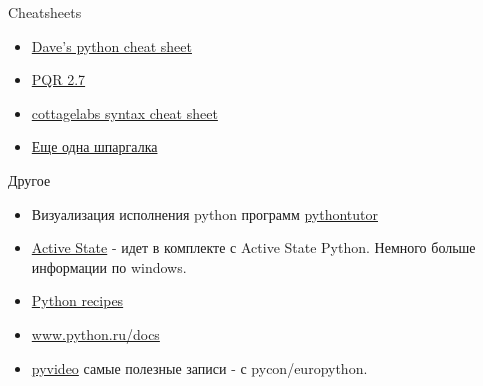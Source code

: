 \documentclass{article}
\begin{document}
\begin{center} Cheatsheets \end{center}
\begin{itemize}
	\item \href{http://www.addedbytes.com/cheat-sheets/python-cheat-sheet/}{Dave's python cheat sheet} 
	\item \href{http://rgruet.free.fr/PQR27/PQR2.7_printing_a4.pdf}{PQR 2.7} 
	\item \href{http://cottagelabs.com/news/python-language-syntax-cheat-sheet}{cottagelabs syntax cheat sheet}
	\item \href{http://cheatography.com/sschaub/cheat-sheets/essential-python/}{Еще одна шпаргалка}
\end{itemize}

\begin{center} Другое \end{center}
\begin{itemize}
	\item Визуализация исполнения python программ 
			\href{http://www.pythontutor.com/visualize.html}{pythontutor}
	\item \href{http://www.activestate.com/activepython}{Active State} - идет в комплекте
	      с Active State Python. Немного больше информации по windows. 
	\item \href{http://code.activestate.com/recipes/langs/python/}{Python recipes}
	\item \href{http://www.python.ru/docs/}{www.python.ru/docs}
	\item \href{http://pyvideo.org/}{pyvideo} самые полезные записи - с pycon/europython.
\end{itemize}

\end{document}
